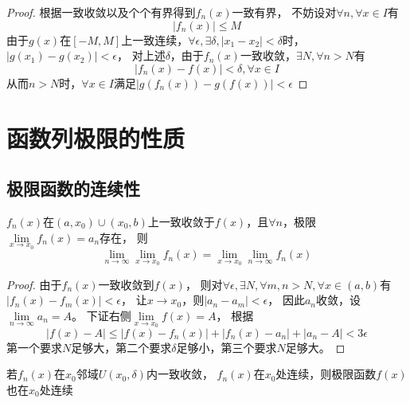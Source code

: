 \begin{proof}
  根据一致收敛以及个个有界得到$f_n(x)$一致有界，
  不妨设对$\forall n, \forall x \in I$有
  \begin{equation*}
    |f_n(x)| \leq M
  \end{equation*}
  由于$g(x)$在$[-M,M]$上一致连续，$\forall \epsilon, \exists \delta, |x_1 - x_2| < \delta$时，$|g(x_1) - g(x_2)| < \epsilon$，
  对上述$\delta$，由于$f_n(x)$一致收敛，$\exists N, \forall n > N$有
  \begin{equation*}
    |f_n(x) - f(x)| < \delta, \forall x \in I
  \end{equation*}
  从而$n > N$时，$\forall x \in I$满足$|g(f_n(x)) - g(f(x))| < \epsilon$
\end{proof}

\section{函数列极限的性质}


\subsection{极限函数的连续性}

\begin{theorem}[极限顺序交换]
  $f_n(x)$在$(a,x_0) \cup (x_0,b)$上一致收敛于$f(x)$，且$\forall n$，极限$\lim \limits _{x \rightarrow x_0}f_n(x) = a_n$存在，
  则
  \begin{equation*}
    \lim \limits _{n \rightarrow \infty} \lim \limits _{x \rightarrow x_0}f_n(x) = \lim \limits _{x \rightarrow x_0} \lim \limits _{n \rightarrow \infty} f_n(x)
  \end{equation*}
\end{theorem}

\begin{proof}
  由于$f_n(x)$一致收敛到$f(x)$，
  则对$\forall \epsilon, \exists N, \forall m,n > N, \forall x \in (a,b)$有$|f_n(x) - f_m(x)| < \epsilon$，
  让$x \rightarrow x_0$，则$|a_n - a_m| < \epsilon$，
  因此$a_n$收敛，设$\lim \limits _{n \rightarrow \infty} a_n = A$。
  下证右侧$\lim \limits _{x \rightarrow x_0}f(x) = A$，
  根据
  \begin{equation*}
    |f(x) - A| \leq |f(x) - f_n(x)| + |f_n(x) - a_n| + |a_n - A| < 3\epsilon
  \end{equation*}
  第一个要求$N$足够大，第二个要求$\delta$足够小，第三个要求$N$足够大。
\end{proof}

\begin{corollary}[局部连续性]
  若$f_n(x)$在$x_0$邻域$U(x_0,\delta)$内一致收敛，
  $f_n(x)$在$x_0$处连续，则极限函数$f(x)$也在$x_0$处连续
\end{corollary}

